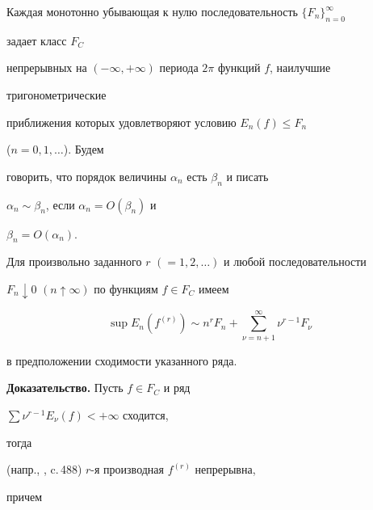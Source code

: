 




\maketitle










Каждая монотонно убывающая к нулю последовательность $\{F_n\}^\infty_{n=0}$


задает класс $F_C$


непрерывных на $(-\infty,+\infty)$ периода $2\pi$ функций $f$, наилучшие


тригонометрические


приближения которых удовлетворяют условию $E_n(f)\le F_n$


($n=0,1,\dotsc$). Будем


говорить, что порядок величины $\alpha_n$ есть $\beta_n$ и писать


$\alpha_n\sim\beta_n$, если $\alpha_n=O(\beta_n)$ и


$\beta_n=O(\alpha_n)$.





\begin{thm}


Для произвольно заданного $r$ $(=1,2,\dotsc)$ и любой последовательности


$F_n\downarrow 0$ $(n\uparrow\infty)$ по функциям $f\in F_C$ имеем


$$


\sup E_n(f^{(r)})\sim n^rF_n+\sum^\infty_{\nu=n+1}\nu^{r-1}F_\nu


$$


в предположении сходимости указанного ряда.


\end{thm}





{\bf Доказательство.} Пусть $f\in F_C$ и ряд


$\sum\nu^{r-1}E_\nu(f)<+\infty$ сходится,


тогда


(напр., \cite{Bar}, c.\,488) $r$-я производная $f^{(r)}$ непрерывна,


причем


